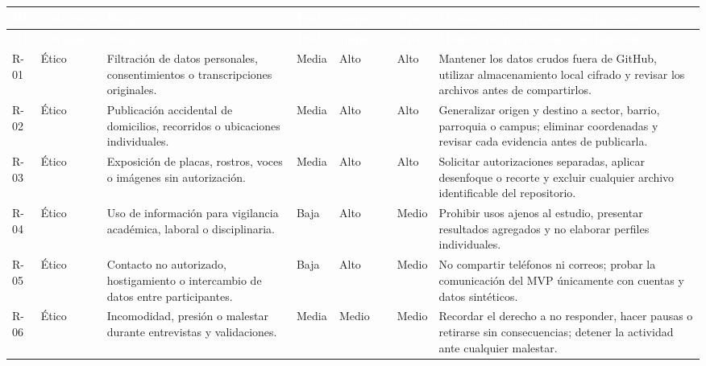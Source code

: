 \documentclass[11pt,a4paper]{article}
\renewcommand{\arraystretch}{1.16}
\begin{document}
\begin{landscape}
\fontsize{7.35}{8.15}\selectfont
\renewcommand{\arraystretch}{1.00}
\setlength{\tabcolsep}{2.6pt}
\begin{longtable}{C{0.75cm} L{2.6cm} L{4.9cm} C{1.35cm} C{1.35cm} C{1.35cm} L{8.0cm}}
\textcolor{white}{\textbf{ID}} &
\textcolor{white}{\textbf{Categoría}} &
\textcolor{white}{\textbf{Riesgo}} &
\textcolor{white}{\textbf{Prob.}} &
\textcolor{white}{\textbf{Impacto}} &
\textcolor{white}{\textbf{Nivel}} &
\textcolor{white}{\textbf{Medida de prevención o mitigación}}\\
\endfirsthead
{}
\textcolor{white}{\textbf{ID}} &
\textcolor{white}{\textbf{Categoría}} &
\textcolor{white}{\textbf{Riesgo}} &
\textcolor{white}{\textbf{Prob.}} &
\textcolor{white}{\textbf{Impacto}} &
\textcolor{white}{\textbf{Nivel}} &
\textcolor{white}{\textbf{Medida de prevención o mitigación}}\\
\endhead
R-01 & Ético & Filtración de datos personales, consentimientos o transcripciones originales. & Media & Alto & Alto & Mantener los datos crudos fuera de GitHub, utilizar almacenamiento local cifrado y revisar los archivos antes de compartirlos.\\
R-02 & Ético & Publicación accidental de domicilios, recorridos o ubicaciones individuales. & Media & Alto & Alto & Generalizar origen y destino a sector, barrio, parroquia o campus; eliminar coordenadas y revisar cada evidencia antes de publicarla.\\
R-03 & Ético & Exposición de placas, rostros, voces o imágenes sin autorización. & Media & Alto & Alto & Solicitar autorizaciones separadas, aplicar desenfoque o recorte y excluir cualquier archivo identificable del repositorio.\\
R-04 & Ético & Uso de información para vigilancia académica, laboral o disciplinaria. & Baja & Alto & Medio & Prohibir usos ajenos al estudio, presentar resultados agregados y no elaborar perfiles individuales.\\
R-05 & Ético & Contacto no autorizado, hostigamiento o intercambio de datos entre participantes. & Baja & Alto & Medio & No compartir teléfonos ni correos; probar la comunicación del MVP únicamente con cuentas y datos sintéticos.\\
R-06 & Ético & Incomodidad, presión o malestar durante entrevistas y validaciones. & Media & Medio & Medio & Recordar el derecho a no responder, hacer pausas o retirarse sin consecuencias; detener la actividad ante cualquier malestar.\\

\end{longtable}
\end{landscape}
\end{document}
